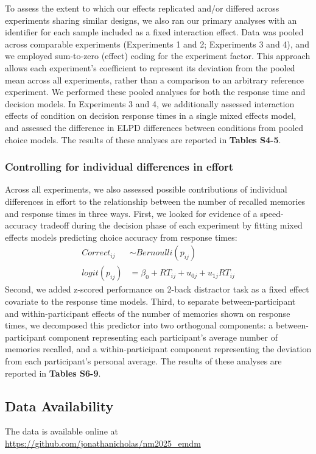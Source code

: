\documentclass[10pt,letterpaper]{article}
\begin{document}
To assess the extent to which our effects replicated and/or differed across experiments sharing similar designs, we also ran our primary analyses with an identifier for each sample included as a fixed interaction effect. Data was pooled across comparable experiments (Experiments 1 and 2; Experiments 3 and 4), and we employed sum-to-zero (effect) coding for the experiment factor. This approach allows each experiment's coefficient to represent its deviation from the pooled mean across all experiments, rather than a comparison to an arbitrary reference experiment. We performed these pooled analyses for both the response time and decision models. In Experiments 3 and 4, we additionally assessed interaction effects of condition on decision response times in a single mixed effects model, and assessed the difference in ELPD differences between conditions from pooled choice models. The results of these analyses are reported in \textbf{Tables S4-5}.

\subsubsection{Controlling for individual differences in effort}

Across all experiments, we also assessed possible contributions of individual differences in effort to the relationship between the number of recalled memories and response times in three ways. First, we looked for evidence of a speed-accuracy tradeoff during the decision phase of each experiment by fitting mixed effects models predicting choice accuracy from response times:
\begin{align*}
Correct_{ij} &\sim Bernoulli(p_{ij}) \\
logit(p_{ij}) &= \beta_0 + RT_{ij}+ u_{0j} + u_{1j}RT_{ij}
\end{align*}
Second, we added z-scored performance on 2-back distractor task as a fixed effect covariate to the response time models. Third, to separate between-participant and within-participant effects of the number of memories shown on response times, we decomposed this predictor into two orthogonal components: a between-participant component representing each participant's average number of memories recalled, and a within-participant component representing the deviation from each participant's personal average. The results of these analyses are reported in \textbf{Tables S6-9}.

\subsection{Data Availability}
The data is available online at \url{https://github.com/jonathanicholas/nm2025_emdm}
\end{document}
